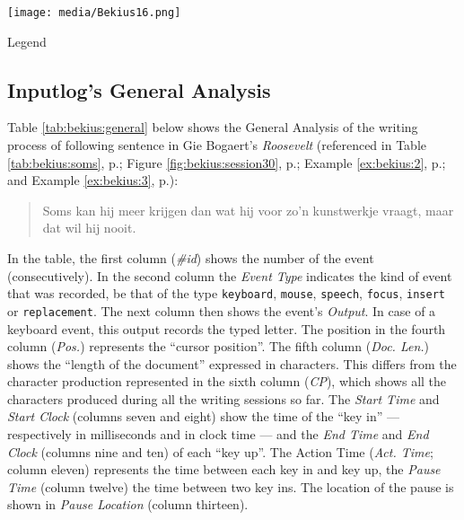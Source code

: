 \begin{paper}
\begin{subappendices}
\begin{table}[H]
    \centering
    \texttt{[image: media/Bekius16.png]}
    \caption{Legend}
    \label{tab:bekius:legend}
\end{table}

\subsection{Inputlog's General Analysis}
\label{app:bekius:generalanalysis}

Table \ref{tab:bekius:general} below shows the General Analysis of the writing process of following sentence in Gie Bogaert's \emph{Roosevelt} (referenced in Table \ref{tab:bekius:soms}, p.\pageref{tab:bekius:soms}; Figure \ref{fig:bekius:session30}, p.\pageref{fig:bekius:session30}; Example \ref{ex:bekius:2}, p.\pageref{ex:bekius:2}; and Example \ref{ex:bekius:3}, p.\pageref{ex:bekius:3}):

\begin{quote}
Soms kan hij meer krijgen dan wat hij voor zo'n 
kunstwerkje vraagt, maar dat wil hij nooit.
\end{quote}

\noindent
In the table, the first column (\textit{\#id})
shows the number of the event (consecutively). In the second column the \textit{Event Type} indicates the kind of event that was recorded, be that of the type \verb|keyboard|, \verb|mouse|, \verb|speech|, \verb|focus|,  \verb|insert| or \verb|replacement|. 
The next column then shows the event's
\textit{Output}. In case of a keyboard event, this output records the typed
letter. The position in the fourth column (\textit{Pos.}) represents the ``cursor
position''. The fifth column (\textit{Doc. Len.}) shows the ``length of the document'' expressed in
characters. This differs from the character production represented in
the sixth column (\textit{CP}), which shows all the characters produced during all
the writing sessions so far. The \textit{Start Time} and \textit{Start Clock} (columns
seven and eight) show the time of the ``key in'' --- respectively in
milliseconds and in clock time --- and the \textit{End Time} and \textit{End Clock}
(columns nine and ten) of each ``key up''. The Action Time (\textit{Act. Time}; column
eleven) represents the time between each key in and key up, the
\textit{Pause Time} (column twelve) the time between two key ins. The location
of the pause is shown in \textit{Pause Location} (column thirteen). 
  

\end{subappendices}
\end{paper}
